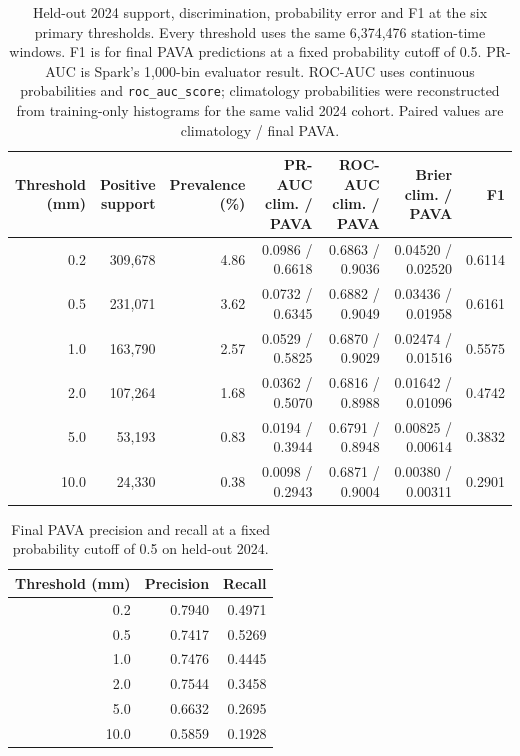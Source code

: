 \documentclass[11pt,a4paper]{article}
\begin{document}
\begin{table}[htbp]
\centering\scriptsize
\caption{Held-out 2024 support, discrimination, probability error and F1 at
the six primary thresholds. Every threshold uses the same 6,374,476
station-time windows. F1 is for final PAVA predictions at a fixed probability
cutoff of 0.5. PR-AUC is Spark's 1,000-bin
evaluator result. ROC-AUC uses continuous probabilities and
\texttt{roc\_auc\_score}; climatology probabilities were
reconstructed from training-only histograms for the same valid 2024 cohort.
Paired values are climatology / final PAVA.}
\label{tab:test}
\begin{tabular}{r r r r r r r}
\toprule
\shortstack{Threshold\\(mm)} &
\shortstack{Positive\\support} &
\shortstack{Prevalence\\(\%)} &
\shortstack{PR-AUC\\clim. / PAVA} &
\shortstack{ROC-AUC\\clim. / PAVA} &
\shortstack{Brier\\clim. / PAVA} &
F1 \\
\midrule
0.2 & 309,678 & 4.86 & 0.0986 / 0.6618 & 0.6863 / 0.9036 & 0.04520 / 0.02520 & 0.6114 \\
0.5 & 231,071 & 3.62 & 0.0732 / 0.6345 & 0.6882 / 0.9049 & 0.03436 / 0.01958 & 0.6161 \\
1.0 & 163,790 & 2.57 & 0.0529 / 0.5825 & 0.6870 / 0.9029 & 0.02474 / 0.01516 & 0.5575 \\
2.0 & 107,264 & 1.68 & 0.0362 / 0.5070 & 0.6816 / 0.8988 & 0.01642 / 0.01096 & 0.4742 \\
5.0 & 53,193 & 0.83 & 0.0194 / 0.3944 & 0.6791 / 0.8948 & 0.00825 / 0.00614 & 0.3832 \\
10.0 & 24,330 & 0.38 & 0.0098 / 0.2943 & 0.6871 / 0.9004 & 0.00380 / 0.00311 & 0.2901 \\
\bottomrule
\end{tabular}
\end{table}

\begin{table}[htbp]
\centering\small
\caption{Final PAVA precision and recall at a fixed probability cutoff of 0.5
on held-out 2024.}
\label{tab:operating-point}
\begin{tabular}{r r r}
\toprule
Threshold (mm) & Precision & Recall \\
\midrule
0.2 & 0.7940 & 0.4971 \\
0.5 & 0.7417 & 0.5269 \\
1.0 & 0.7476 & 0.4445 \\
2.0 & 0.7544 & 0.3458 \\
5.0 & 0.6632 & 0.2695 \\
10.0 & 0.5859 & 0.1928 \\
\bottomrule
\end{tabular}
\end{table}
\end{document}
